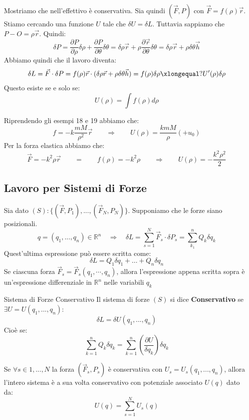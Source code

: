 \documentclass[11pt,a4paper,twoside]{article}
\theoremstyle{definition}
\begin{document}
Mostriamo che nell'effettivo è conservativa. Sia quindi $(\vec F, P)$ con $\vec F = f(\rho)\vec r$.\\
Stiamo cercando una funzione $U$ tale che $\delta U = \delta L$. Tuttavia sappiamo che $P-O = \rho\vec r$. Quindi:
\[ \delta P = \frac{\partial P}{\partial \rho}\delta \rho + \frac{\partial P}{\partial \theta}\delta \theta = \delta \rho \vec r + \rho \frac{\partial \vec r}{\partial \theta}\delta \theta = \delta \rho \vec r + \rho \delta \theta \vec h \]
Abbiamo quindi che il lavoro diventa:
\[ \delta L = \vec F \cdot \delta P = f(\rho) \vec r \cdot (\delta \rho \vec r + \rho \delta \theta 	\vec h) = f(\rho)\delta \rho \xlongequal ? U'(\rho)\delta \rho \]
Questo esiste se e solo se:
\[ U(\rho) = \int f(\rho)d\rho \]

Riprendendo gli esempi 18 e 19 abbiamo che:
\[ f = -k \frac{mM}{\rho^2} \vec r \qquad \Rightarrow \qquad U(\rho) = \frac{kmM}{\rho} (+ u_0) \]
Per la forza elastica abbiamo che:
\[ \vec F = -k^2 \rho \vec r\qquad = \qquad f(\rho) = -k^2\rho \qquad \Rightarrow \qquad U(\rho)=-\frac{k^2\rho^2}{2} \]

\subsection{Lavoro per Sistemi di Forze}

Sia dato $(S):\{(\vec F, P_1),...,(\vec F_N, P_N)\}$. Supponiamo che le forze siano posizionali.
\[ q=(q_1,...,q_n) \in \mathbb R^n \quad \Rightarrow \quad \delta L = \sum_{s = 1}^N \vec F_s \cdot \delta P_s = \sum_{k_1}^n Q_k \delta q_k \]
Quest'ultima espressione può essere scritta come:
\[ \delta L = Q_1\delta q_1 + ... + Q_n\delta q_n \]
Se ciascuna forza $\vec F_s = \vec F_s(q_1,\cdots, q_n)$, allora l'espressione appena scritta sopra è un'espressione differenziale in $\mathbb R^n$ nelle variabili $q_k$

\begin{defn}{Sistema di Forze Conservativo}{}
	Il sistema di forze $(S)$ si dice \textbf{Conservativo} se $\exists U= U(q_1,...,q_n)$:
	\[ \delta L = \delta U(q_1,..., q_n) \]
	Cioè se:
	\[ \sum_{k = 1}^n Q_k \delta q_k = \sum_{k = 1}^n \left( \frac{\partial U}{\delta q_k} \right) \delta q_k \]
\end{defn}

\begin{prop}{}{}
	Se $\forall s\in {1,..., N}$ la forza $(\vec F_s, P_s)$ è conservativa con $U_s = U_s(q_1,..., q_n)$, allora l'intero sistema è a sua volta conservativo con potenziale associato $U(q)$ dato da:
	\[ U(q) = \sum_{s = 1}^N U_s(q) \]
\end{prop}
\end{document}
